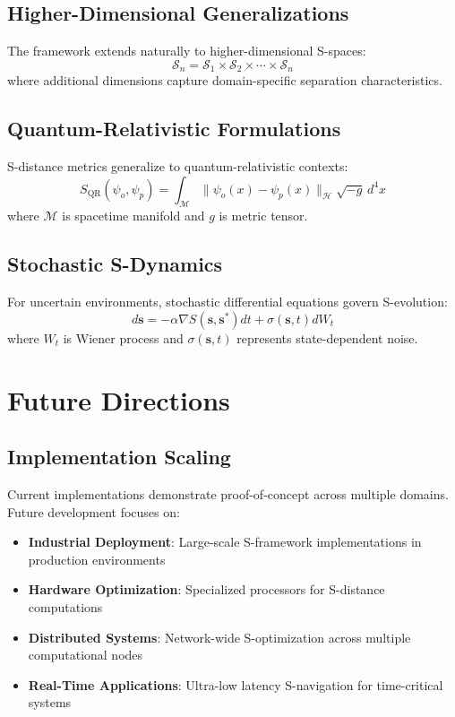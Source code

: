 \documentclass[11pt]{article}
\theoremstyle{definition}
\theoremstyle{remark}
\begin{document}
\subsection{Higher-Dimensional Generalizations}

The framework extends naturally to higher-dimensional S-spaces:
\begin{equation}
\mathcal{S}_n = \mathcal{S}_1 \times \mathcal{S}_2 \times \cdots \times \mathcal{S}_n
\end{equation}
where additional dimensions capture domain-specific separation characteristics.

\subsection{Quantum-Relativistic Formulations}

S-distance metrics generalize to quantum-relativistic contexts:
\begin{equation}
S_{\text{QR}}(\psi_o, \psi_p) = \int_{\mathcal{M}} \|\psi_o(x) - \psi_p(x)\|_{\mathcal{H}} \sqrt{-g} \, d^4x
\end{equation}
where $\mathcal{M}$ is spacetime manifold and $g$ is metric tensor.

\subsection{Stochastic S-Dynamics}

For uncertain environments, stochastic differential equations govern S-evolution:
\begin{equation}
d\mathbf{s} = -\alpha \nabla S(\mathbf{s}, \mathbf{s}^*) dt + \sigma(\mathbf{s}, t) dW_t
\end{equation}
where $W_t$ is Wiener process and $\sigma(\mathbf{s}, t)$ represents state-dependent noise.

\section{Future Directions}

\subsection{Implementation Scaling}

Current implementations demonstrate proof-of-concept across multiple domains. Future development focuses on:

\begin{itemize}
\item \textbf{Industrial Deployment}: Large-scale S-framework implementations in production environments
\item \textbf{Hardware Optimization}: Specialized processors for S-distance computations
\item \textbf{Distributed Systems}: Network-wide S-optimization across multiple computational nodes
\item \textbf{Real-Time Applications}: Ultra-low latency S-navigation for time-critical systems
\end{itemize}
\end{document}
